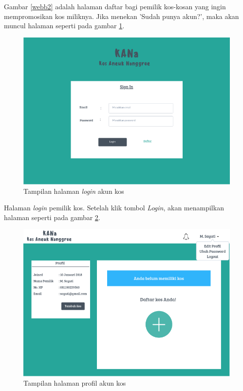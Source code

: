 \begin{enumerate}[a.]
Gambar \ref{webb2} adalah halaman daftar bagi pemilik kos-kosan yang ingin mempromosikan kos miliknya. Jika menekan 'Sudah punya akun?', maka akan muncul halaman seperti pada gambar \ref{webb1}.
	
	\begin{figure}[H]
		\centering
		\includegraphics[scale=0.5]{gambar/web1}
		\caption{Tampilan halaman \textit{login} akun kos}
		\label{webb1}
	\end{figure}
	
Halaman \textit{login} pemilik kos. Setelah klik tombol \textit{Login}, akan menampilkan halaman seperti pada gambar \ref{webb3}.
	
	\begin{figure}[H]
		\centering
		\includegraphics[scale=0.5]{gambar/web3}
		\caption{Tampilan halaman profil akun kos}
		\label{webb3}
	\end{figure}
	

\end{enumerate}
